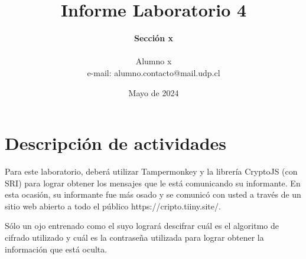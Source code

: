 \documentclass[letter,12pt]{article}
\begin{document}
%
   \title{\Huge{Informe Laboratorio 4}}

   \author{\textbf{Sección x} \\  \\Alumno x \\ e-mail: alumno.contacto@mail.udp.cl}
          
   \date{Mayo de 2024}

   \maketitle
   
   \tableofcontents
 
  \newpage
  

\section{Descripción de actividades}
Para este laboratorio, deberá utilizar Tampermonkey y la librería CryptoJS (con SRI) para lograr obtener los mensajes que le está comunicando su informante. En esta ocasión, su informante fue más osado y se comunicó con usted a través de un sitio web abierto a todo el público https://cripto.tiiny.site/.\par
Sólo un ojo entrenado como el suyo logrará descifrar cuál es el algoritmo de cifrado utilizado y cuál es la contraseña utilizada para lograr obtener la información que está oculta.
\end{document}
